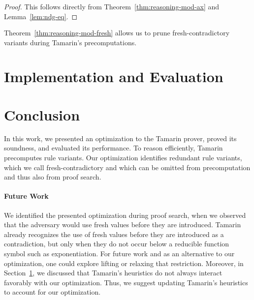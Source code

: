 \documentclass[envcountsame,orivec]{llncs}
\begin{document}
\begin{proof}
  This follows directly from Theorem~\ref{thm:reasoning-mod-ax} and Lemma~\ref{lem:ndg-eq}.
\end{proof}

Theorem~\ref{thm:reasoning-mod-fresh} allows us to prune fresh-contradictory variants during Tamarin's precomputations.

\section{Implementation and Evaluation}
\label{sec:eval}



\section{Conclusion}

In this work, we presented an optimization to the Tamarin prover, proved its soundness, and evaluated its performance.
To reason efficiently, Tamarin precomputes rule variants.
Our optimization identifies redundant rule variants, which we call fresh-contradictory and which can be omitted from precomputation and thus also from proof search.

\paragraph{Future Work}
We identified the presented optimization during proof search, when we observed that the adversary would use fresh values before they are introduced.
Tamarin already recognizes the use of fresh values before they are introduced as a contradiction, but only when they do not occur below a reducible function symbol such as exponentiation.
For future work and as an alternative to our optimization, one could explore lifting or relaxing that restriction.
Moreover, in Section~\ref{sec:eval}, we discussed that Tamarin's heuristics do not always interact favorably with our optimization.
Thus, we suggest updating Tamarin's heuristics to account for our optimization.



\end{document}
